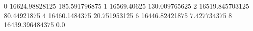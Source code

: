 0 16624.98828125 185.591796875
1 16569.40625 130.009765625
2 16519.845703125 80.44921875
4 16460.1484375 20.751953125
6 16446.82421875 7.427734375
8 16439.396484375 0.0
